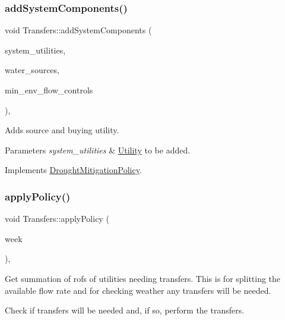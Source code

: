 \subsubsection{\texorpdfstring{add\+System\+Components()}{addSystemComponents()}}
{\footnotesize\ttfamily void Transfers\+::add\+System\+Components (\begin{DoxyParamCaption}\item[{vector$<$ \mbox{\hyperlink{classUtility}{Utility}} $\ast$$>$}]{system\+\_\+utilities,  }\item[{vector$<$ \mbox{\hyperlink{classWaterSource}{Water\+Source}} $\ast$$>$}]{water\+\_\+sources,  }\item[{vector$<$ \mbox{\hyperlink{classMinEnvFlowControl}{Min\+Env\+Flow\+Control}} $\ast$$>$}]{min\+\_\+env\+\_\+flow\+\_\+controls }\end{DoxyParamCaption})\hspace{0.3cm}{\ttfamily [override]}, {\ttfamily [virtual]}}

Adds source and buying utility. 
\begin{DoxyParams}{Parameters}
{\em system\+\_\+utilities} & \mbox{\hyperlink{classUtility}{Utility}} to be added. \\
\hline
\end{DoxyParams}


Implements \mbox{\hyperlink{classDroughtMitigationPolicy_aaab042a79d781afe8e08753b7012372a}{Drought\+Mitigation\+Policy}}.

\mbox{\label{classTransfers_ad9e4e83ff763ac1ba518a19051cd2e69}} 
\subsubsection{\texorpdfstring{apply\+Policy()}{applyPolicy()}}
{\footnotesize\ttfamily void Transfers\+::apply\+Policy (\begin{DoxyParamCaption}\item[{int}]{week }\end{DoxyParamCaption})\hspace{0.3cm}{\ttfamily [override]}, {\ttfamily [virtual]}}

Get summation of rofs of utilities needing transfers. This is for splitting the available flow rate and for checking weather any transfers will be needed.

Check if transfers will be needed and, if so, perform the transfers.

